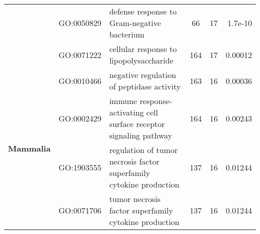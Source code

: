 \begin{landscape}
\begin{longtable}[c]{@{}lllccr@{}}
		                                               & GO:0050829                         & defense response to Gram-negative bacterium                               & 66                                                                 & 17                                                                   & 1.7e-10                                                                                  \\
		                                               & GO:0071222                         & cellular response to lipopolysaccharide                                   & 164                                                                & 17                                                                   & 0.00012                                                                                  \\
		\multirow{13}{*}{\textbf{Mammalia}}            & GO:0010466                         & negative regulation of peptidase activity                                 & 163                                                                & 16                                                                   & 0.00036                                                                                  \\
		                                               & GO:0002429                         & immune response-activating cell surface receptor signaling pathway        & 164                                                                & 16                                                                   & 0.00243                                                                                  \\
		                                               & GO:1903555                         & regulation of tumor necrosis factor superfamily cytokine production       & 137                                                                & 16                                                                   & 0.01244                                                                                  \\
		                                               & GO:0071706                         & tumor necrosis factor superfamily cytokine production                     & 137                                                                & 16                                                                   & 0.01244                                                                                  \\

\end{longtable}
\end{landscape}
